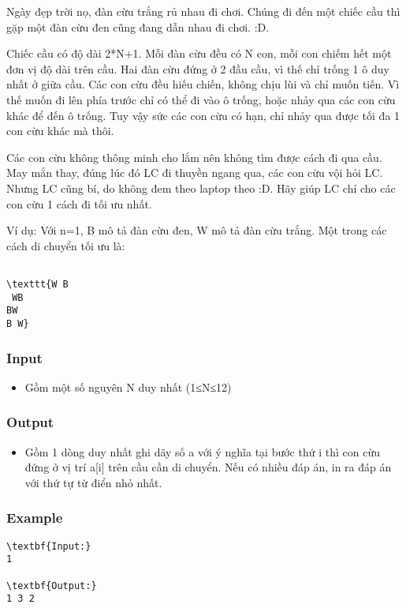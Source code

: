 

Ngày đẹp trời nọ, đàn cừu trắng rủ nhau đi chơi. Chúng đi đến một chiếc cầu thì gặp một đàn cừu đen cũng đang dẫn nhau đi chơi. :D.

Chiếc cầu có độ dài 2*N+1. Mỗi đàn cừu đều có N con, mỗi con chiếm hết một đơn vị độ dài trên cầu. Hai đàn cừu đứng ở 2 đầu cầu, vì thế chỉ trống 1 ô duy nhất ở giữa cầu. Các con cừu đều hiếu chiến, không chịu lùi và chỉ muốn tiến. Vì thế muốn đi lên phía trước chỉ có thể đi vào ô trống, hoặc nhảy qua các con cừu khác để đến ô trống. Tuy vậy sức các con cừu có hạn, chỉ nhảy qua được tối đa 1 con cừu khác mà thôi.

Các con cừu không thông minh cho lắm nên không tìm được cách đi qua cầu. May mắn thay, đúng lúc đó LC đi thuyền ngang qua, các con cừu vội hỏi LC. Nhưng LC cũng bí, do không đem theo laptop theo :D. Hãy giúp LC chỉ cho các con cừu 1 cách đi tối ưu nhất.

Ví dụ: Với n=1, B mô tả đàn cừu đen, W mô tả đàn cừu trắng. Một trong các cách di chuyển tối ưu là:
\begin{verbatim}

\texttt{W B
 WB
BW 
B W}\end{verbatim}

\subsubsection{Input}
\begin{itemize}
	\item Gồm một số nguyên N duy nhất (1≤N≤12)
\end{itemize}

\subsubsection{Output}
\begin{itemize}
	\item Gồm 1 dòng duy nhất ghi dãy số a với ý nghĩa tại bước thứ i thì con cừu đứng ở vị trí a[i] trên cầu cần di chuyển. Nếu có nhiều đáp án, in ra đáp án với thứ tự từ điển nhỏ nhất.
\end{itemize}

\subsubsection{Example}
\begin{verbatim}
\textbf{Input:}
1

\textbf{Output:}
1 3 2
\end{verbatim}